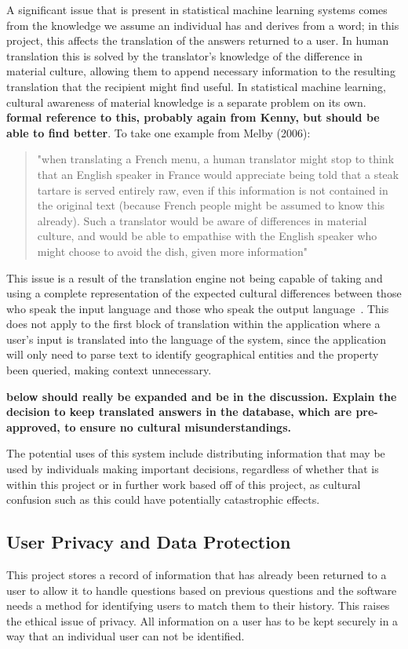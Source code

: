 \documentclass[authoryearcitations]{UoYCSproject}
\begin{document}
A significant issue that is present in statistical machine learning systems comes from the knowledge we assume an individual has and derives from a word; in this project, this affects the translation of the answers returned to a user.  In human translation this is solved by the translator's knowledge of the difference in material culture, allowing them to append necessary information to the resulting translation that the recipient might find useful.  In statistical machine learning, cultural awareness of material knowledge is a separate problem on its own.  {\bf formal reference to this, probably again from Kenny, but should be able to find better}.  To take one example from Melby (2006):

\blockquote{"when translating a French menu, a human translator might stop to think that an English speaker in France would appreciate being told that a steak tartare is served entirely raw, even if this information is not contained in the original text (because French people might be assumed to know this already). Such a translator would be aware of differences in material culture, and would be able to empathise with the English speaker who might choose to avoid the dish, given more information"~\cite{melby2006can, kenny2011ethics}}

This issue is a result of the translation engine not being capable of taking and using a complete representation of the expected cultural differences between those who speak the input language and those who speak the output language~\cite{melby2006can}. This does not apply to the first block of translation within the application where a user's input is translated into the language of the system, since the application will only need to parse text to identify geographical entities and the property been queried, making context unnecessary.

{\bf below should really be expanded and be in the discussion.  Explain the decision to keep translated answers in the database, which are pre-approved, to ensure no cultural misunderstandings.}

The potential uses of this system include distributing information that may be used by individuals making important decisions, regardless of whether that is within this project or in further work based off of this project, as cultural confusion such as this could have potentially catastrophic effects.

\subsection{User Privacy and Data Protection}
\label{subsubsec:userPrivacyAndDataProtection}
This project stores a record of information that has already been returned to a user to allow it to handle questions based on previous questions and the software needs a method for identifying users to match them to their history. This raises the ethical issue of privacy. All information on a user has to be kept securely in a way that an individual user can not be identified.
\end{document}
